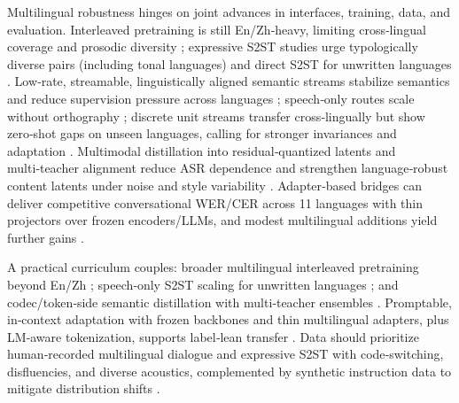 Multilingual robustness hinges on joint advances in interfaces, training, data, and evaluation. Interleaved pretraining is still En/Zh‑heavy, limiting cross‑lingual coverage and prosodic diversity \cite{zeng2024scalingspeechtextpretrainingsyntheticint}; expressive S2ST studies urge typologically diverse pairs (including tonal languages) and direct S2ST for unwritten languages \cite{huang2023holisticcascadesystembenchmarkhumanevalu}. Low‑rate, streamable, linguistically aligned semantic streams stabilize semantics and reduce supervision pressure across languages \cite{tseng2025tastetextalignedspeechtokenizationembedd}; speech‑only routes scale without orthography \cite{peng2024mslms2stmultitaskspeechlanguagemodeltext}; discrete unit streams transfer cross‑lingually but show zero‑shot gaps on unseen languages, calling for stronger invariances and adaptation \cite{hsu2024exploringcontextlearningtextlessspeechla}. Multimodal distillation into residual‑quantized latents and multi‑teacher alignment reduce ASR dependence and strengthen language‑robust content latents under noise and style variability \cite{ahasan2025dmcodecdistillingmultimodalrepresentatio}. Adapter‑based bridges can deliver competitive conversational WER/CER across 11 languages with thin projectors over frozen encoders/LLMs, and modest multilingual additions yield further gains \cite{li2025transsionmultilingualspeechrecognitionsy}.

A practical curriculum couples: broader multilingual interleaved pretraining beyond En/Zh \cite{zeng2024scalingspeechtextpretrainingsyntheticint}; speech‑only S2ST scaling for unwritten languages \cite{peng2024mslms2stmultitaskspeechlanguagemodeltext}; and codec/token‑side semantic distillation with multi‑teacher ensembles \cite{ahasan2025dmcodecdistillingmultimodalrepresentatio}. Promptable, in‑context adaptation with frozen backbones and thin multilingual adapters, plus LM‑aware tokenization, supports label‑lean transfer \cite{hsu2024exploringcontextlearningtextlessspeechla,turetzky2024lastlanguagemodelawarespeechtokenization,wang2023slmbridgethingapbetweenspeechtextfoundat,xu2025optimaltransportregularizationspeechtext}. Data should prioritize human‑recorded multilingual dialogue and expressive S2ST with code‑switching, disfluencies, and diverse acoustics, complemented by synthetic instruction data to mitigate distribution shifts \cite{shu2023llasmlargelanguagespeechmodel,zeng2024scalingspeechtextpretrainingsyntheticint,huang2023holisticcascadesystembenchmarkhumanevalu,ahasan2025dmcodecdistillingmultimodalrepresentatio}.

